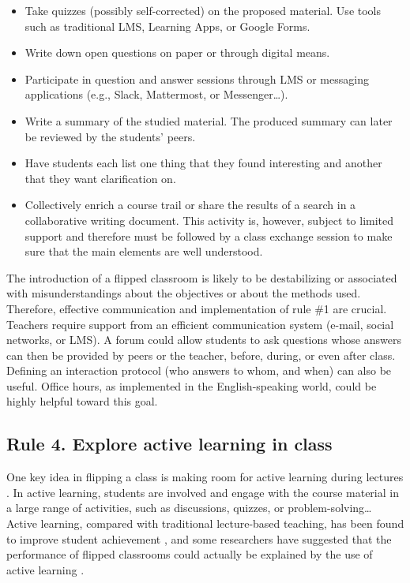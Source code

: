 \documentclass[10pt,letterpaper]{article}
\begin{document}
\begin{itemize}

\item Take quizzes (possibly self-corrected) on the proposed material. 
Use tools such as traditional LMS, Learning Apps, or Google Forms.

\item Write down open questions on paper or through digital means.

\item Participate in question and answer sessions through LMS 
or messaging applications (e.g., Slack, Mattermost, or Messenger\ldots).

\item Write a summary of the studied material. 
The produced summary can later be reviewed by the students’ peers.

\item Have students each list one thing that they found interesting and another that they
want clarification on.

\item Collectively enrich a course trail or share the results of a search in a collaborative writing document. 
This activity is, however, subject to limited support and therefore must be followed 
by a class exchange session to make sure that the main elements are well understood.

\end{itemize}

The introduction of a flipped classroom is likely to be destabilizing or associated with misunderstandings 
about the objectives or about the methods used. Therefore, effective communication 
\cite{lo_critical_2017} and implementation of rule \#1 are crucial. 
Teachers require support from an efficient communication system (e-mail, social networks, or LMS). 
A forum could allow students to ask questions whose answers can then be provided by peers 
or the teacher, before, during, or even after class. Defining an interaction protocol 
(who answers to whom, and when) can also be useful. 
Office hours, as implemented in the English-speaking world, could be highly helpful toward this goal.


\subsection{Rule 4. Explore active learning in class}

One key idea in flipping a class is making room for active learning during lectures \cite{delozier_flipped_2017}.
In active learning, students are involved and engage with the course material in a large range of activities, 
such as discussions, quizzes, or problem-solving\ldots{} 
Active learning, compared with traditional lecture-based teaching, has been found to improve student achievement \cite{freeman_reply_2014}, and some researchers have suggested that the performance of flipped classrooms 
could actually be explained by the use of active learning \cite{jensen_improvements_2015}.
\end{document}
